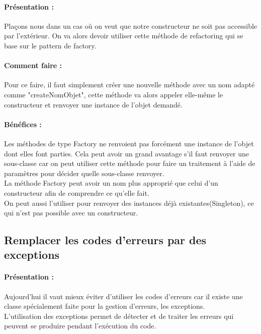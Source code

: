 \documentclass[a4paper,twoside,12pt,openright]{report}
\begin{document}
\paragraph{Présentation :}
Plaçons nous dans un cas où on veut que notre constructeur ne soit pas accessible par l'extérieur.
On va alors devoir utiliser cette méthode de refactoring qui se base sur le pattern de factory.

\paragraph{Comment faire :}
Pour ce faire, il faut simplement créer une nouvelle méthode avec un nom adapté comme "createNomObjet", cette méthode va alors appeler elle-même le constructeur et renvoyer une instance de l'objet demandé.

\paragraph{Bénéfices :}
Les méthodes de type Factory ne renvoient pas forcément une instance de l'objet dont elles font parties. Cela peut avoir un grand avantage s'il faut renvoyer une sous-classe car on peut utiliser cette méthode pour faire un traitement à l'aide de paramètres pour décider quelle sous-classe renvoyer.\\
La méthode Factory peut avoir un nom plus approprié que celui d'un constructeur afin de comprendre ce qu'elle fait.\\
On peut aussi l'utiliser pour renvoyer des instances déjà existantes(Singleton), ce qui n'est pas possible avec un constructeur.\\

\newpage

\subsection{Remplacer les codes d'erreurs par des exceptions}
\paragraph{Présentation :}
Aujourd'hui il vaut mieux éviter d'utiliser les codes d'erreurs car il existe une classe spécialement faite pour la gestion d'erreurs, les exceptions.\\
L'utilisation des exceptions permet de détecter et de traiter les erreurs qui peuvent se produire pendant l'exécution du code.\\
\end{document}
